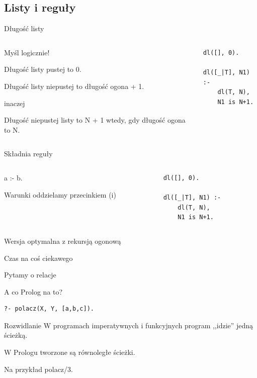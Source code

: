 \documentclass[blue]{beamer}
\begin{document}
\subsection{Listy i reguły}
\begin{frame}[fragile]{Długość listy}
\begin{columns}
\begin{column}{.5\linewidth}
Myśl logicznie!

Długość listy pustej to 0.

Długość listy niepustej to długość ogona + 1.

inaczej

Długość niepustej listy to N + 1 wtedy, gdy długość ogona to N.
\end{column}
\begin{column}{.5\linewidth}
\begin{lstlisting}
dl([], 0).

dl([_|T], N1) :-
    dl(T, N),
    N1 is N+1.
\end{lstlisting}
\end{column}
\end{columns}
\end{frame}
\begin{frame}[fragile]{Składnia reguły}
\begin{columns}
\begin{column}{.5\linewidth}
a :- b.

Warunki oddzielamy przecinkiem (i)
\end{column}
\begin{column}{.5\linewidth}
\begin{lstlisting}
dl([], 0).

dl([_|T], N1) :-
    dl(T, N),
    N1 is N+1.
\end{lstlisting}
\end{column}
\end{columns}
\end{frame}
\begin{frame}[fragile]{Wersja optymalna z rekursją ogonową}

\end{frame}
\begin{frame}[fragile]{Czas na coś ciekawego}


Pytamy o relacje

A co Prolog na to?

\begin{lstlisting}
?- polacz(X, Y, [a,b,c]).
\end{lstlisting}
\end{frame}
\begin{frame}{Rozwidlanie}
W programach imperatywnych i funkcyjnych program ,,idzie'' jedną ścieżką.

W Prologu tworzone są równoległe ścieżki.

Na przykład polacz/3.
\end{frame}
\end{document}
